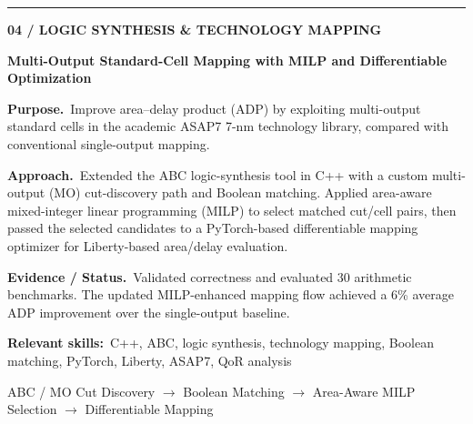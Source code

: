 \documentclass[a4paper,11pt]{article}
\newcommand{\project}[6]{%
{\small\color{muted}\bfseries #1}\par\vspace{3pt}
{\fontsize{12}{14}\selectfont\bfseries #2}\par\vspace{8pt}
{\small\textbf{Purpose.}\ #3}\par\vspace{6pt}
{\small\textbf{Approach.}\ #4}\par\vspace{6pt}
{\small\textbf{Evidence / Status.}\ #5}\par\vspace{6pt}
{\footnotesize\textbf{Relevant skills:}\ #6}\par\vspace{10pt}}
\newcommand{\flowline}[1]{\noindent\colorbox{shade}{\parbox{\dimexpr\linewidth-2\fboxsep}{\centering\footnotesize\color{muted} #1}}\par\vspace{18pt}}
\newcommand{\separate}{\par\noindent\color{rulecol}\rule{\linewidth}{0.7pt}\color{ink}\par\vspace{13pt}}
\begin{document}
\separate
\project{04 \quad / \quad LOGIC SYNTHESIS \& TECHNOLOGY MAPPING}
{Multi-Output Standard-Cell Mapping with MILP and Differentiable Optimization}
{Improve area--delay product (ADP) by exploiting multi-output standard cells in the academic ASAP7 7-nm technology library, compared with conventional single-output mapping.}
{Extended the ABC logic-synthesis tool in C++ with a custom multi-output (MO) cut-discovery path and Boolean matching. Applied area-aware mixed-integer linear programming (MILP) to select matched cut/cell pairs, then passed the selected candidates to a PyTorch-based differentiable mapping optimizer for Liberty-based area/delay evaluation.}
{Validated correctness and evaluated 30 arithmetic benchmarks. The updated MILP-enhanced mapping flow achieved a 6\% average ADP improvement over the single-output baseline.}
{C++, ABC, logic synthesis, technology mapping, Boolean matching, PyTorch, Liberty, ASAP7, QoR analysis}
\flowline{ABC / MO Cut Discovery $\longrightarrow$ Boolean Matching $\longrightarrow$ Area-Aware MILP Selection $\longrightarrow$ Differentiable Mapping}
\vfill
\end{document}
